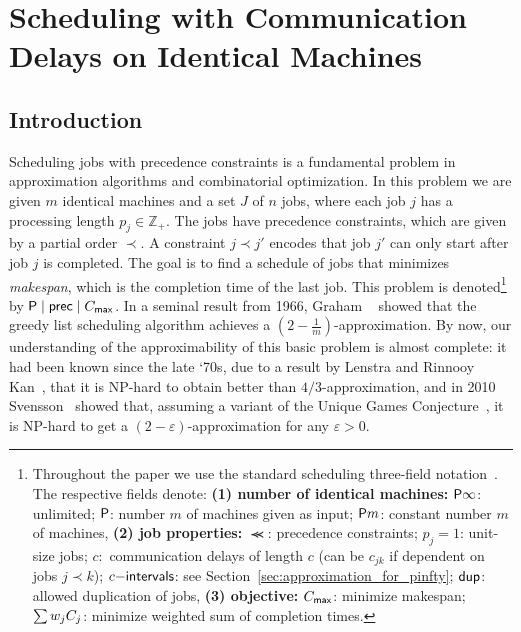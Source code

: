 \chapter{Scheduling with Communication Delays on Identical Machines}\label{chapter: S1}
\section{Introduction}

Scheduling jobs with precedence constraints is a fundamental problem in approximation algorithms and combinatorial optimization.
In this problem we are given $m$ identical  machines and a set  $J$ of $n$ jobs, where each job $j$ has a processing length $p_j  \in \mathbb{Z}_+$.
The jobs have precedence constraints, which are given by a partial order $\prec$. 
A constraint $j \prec j'$ encodes that job $j'$ can only start after job $j$ is completed.
The goal is to find a schedule of jobs that minimizes {\em makespan}, which is the completion time of the last job.
This problem is denoted\footnote{
	Throughout the paper we use the standard scheduling three-field notation~\cite{GLLR79,VeltmanLL90}.
	The respective fields
	denote:
	\textbf{(1)
	number of identical machines:} $\mathsf{P} \infty$: unlimited; $\mathsf{P}$: number $m$ of machines given as input; $\mathsf{P} m$: constant number $m$ of machines,
	\textbf{(2) job properties:} $\Prec$: precedence constraints; $p_j=1$: unit-size jobs; $c$:~communication delays of length $c$ (can be $c_{jk}$ if dependent on jobs $j \prec k$); $c\mathsf{-intervals}$: see Section~\ref{sec:approximation_for_pinfty}; $\mathsf{dup}$: allowed duplication of jobs,
	\textbf{(3) objective:} $C_{\mathsf{max}}$: minimize makespan; $\sum w_j C_j$: minimize weighted sum of completion times.
}
by $\mathsf{P} \mid \mathsf{prec} \mid C_{\mathsf{max}}$.
In a seminal result from 1966, Graham ~\cite{GrahamListScheduling1966} showed that the greedy list scheduling algorithm achieves a $\left(2- \frac{1}{m}\right)$-approximation. 
By now, our understanding of the approximability of this basic problem is almost complete: 
it had been known since the late `70s, due to a result by Lenstra and Rinnooy Kan~\cite{LR78}, that it is NP-hard to obtain better than $4/3$-approximation, and in 2010 Svensson~\cite{Svensson10} showed that, assuming a variant of the Unique Games Conjecture~\cite{BansalK10}, it is NP-hard to get a $(2-\varepsilon)$-approximation for any $\varepsilon > 0$.

